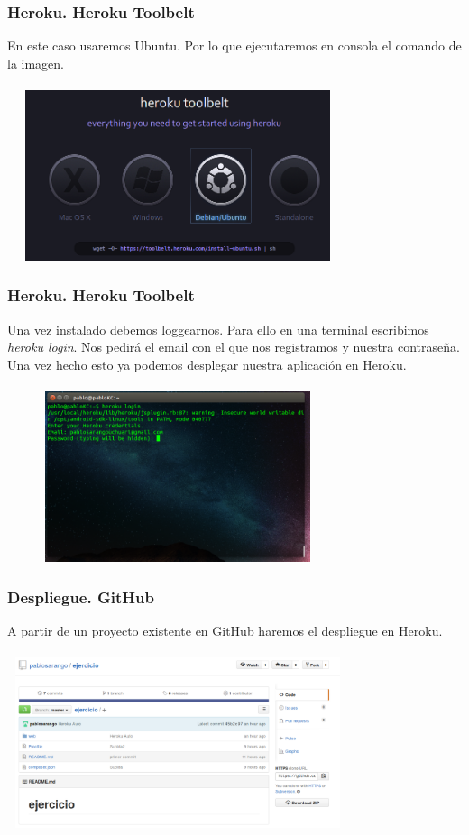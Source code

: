 \documentclass{beamer}
\begin{document}
\begin{frame}
\frametitle{Heroku. Heroku Toolbelt}
En este caso usaremos Ubuntu. Por lo que ejecutaremos en consola el comando de la imagen.\\ \ \\
\includegraphics[width=10cm, height=5cm]{githubHeroku/23.png}
\end{frame}

\begin{frame}
\frametitle{Heroku. Heroku Toolbelt}
Una vez instalado debemos loggearnos. Para ello en una terminal escribimos \textit{heroku login}. Nos pedirá el email con el que nos registramos y nuestra contraseña. Una vez hecho esto ya podemos desplegar nuestra aplicación en Heroku.\\ \ \\
\includegraphics[width=10cm, height=5cm]{githubHeroku/5.png}
\end{frame}

\begin{frame}
\frametitle{Despliegue. GitHub}
A partir de un proyecto existente en GitHub haremos el despliegue en Heroku.\\ \ \\
\includegraphics[width=10cm, height=5cm]{githubHeroku/24.png}
\end{frame}
\end{document}
